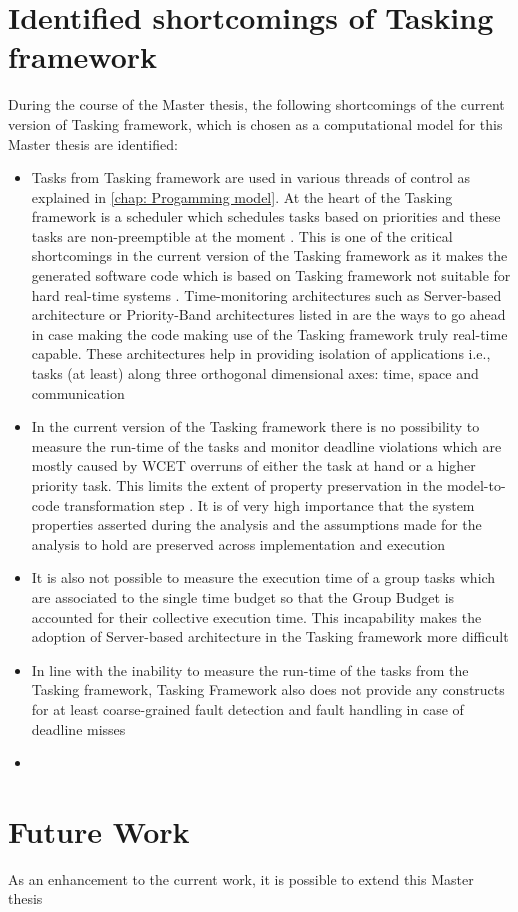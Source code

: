 \section{Identified shortcomings of Tasking framework}
During the course of the Master thesis, the following shortcomings of the current version of Tasking framework, which is chosen as a computational model for this Master thesis are identified:
\begin{itemize}
\item Tasks from Tasking framework are used in various threads of control as explained in \cref{chap: Progamming model}. At the heart of the Tasking framework is a scheduler which schedules tasks based on priorities and these tasks are non-preemptible at the moment \cite{TaskFr}. This is one of the critical shortcomings in the current version of the Tasking framework as it makes the generated software code which is based on Tasking framework not suitable for hard real-time systems \cite{TempIsolation}. Time-monitoring architectures such as Server-based architecture or Priority-Band architectures listed in \cite{TempIsolation} are the ways to go ahead in case making the code making use of the Tasking framework truly real-time capable. These architectures help in providing isolation of applications i.e., tasks (at least) along three orthogonal dimensional axes: time, space and communication
\item In the current version of the Tasking framework there is no possibility to measure the run-time of the tasks and monitor deadline violations which are mostly caused by WCET overruns of either the task at hand or a higher priority task. This limits the extent of property preservation in the model-to-code transformation step \cite{TempIsolation}. It is of very high importance that the system properties asserted during the analysis and the assumptions made for the analysis to hold are preserved across implementation and execution \cite{EvoRAVCodeAr}\cite{TempIsolation}
\item It is also not possible to measure the execution time of a group tasks which are associated to the single time budget so that the Group Budget is accounted for their collective execution time. This incapability makes the adoption of Server-based architecture in the Tasking framework more difficult
\item In line with the inability to measure the run-time of the tasks from the Tasking framework, Tasking Framework also does not provide any constructs for at least coarse-grained fault detection and fault handling in case of deadline misses
\item 
\end{itemize}

\section{Future Work}
As an enhancement to the current work, it is possible to extend this Master thesis  
\label{section: Future work}

